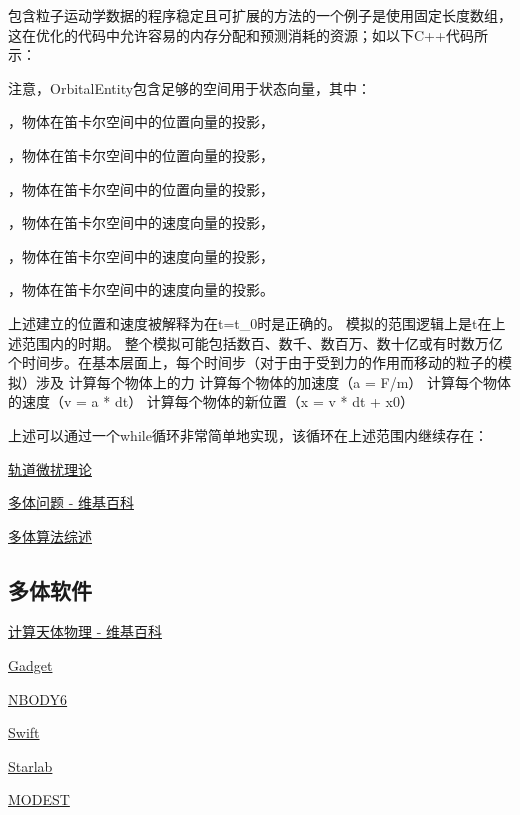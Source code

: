 包含粒子运动学数据的程序稳定且可扩展的方法的一个例子是使用固定长度数组，这在优化的代码中允许容易的内存分配和预测消耗的资源；如以下C++代码所示：

注意，OrbitalEntity包含足够的空间用于状态向量，其中：

，物体在笛卡尔空间中的位置向量的投影，

，物体在笛卡尔空间中的位置向量的投影，

，物体在笛卡尔空间中的位置向量的投影，

，物体在笛卡尔空间中的速度向量的投影，

，物体在笛卡尔空间中的速度向量的投影，

，物体在笛卡尔空间中的速度向量的投影。



上述建立的位置和速度被解释为在t=t_0时是正确的。
模拟的范围逻辑上是t在上述范围内的时期。
整个模拟可能包括数百、数千、数百万、数十亿或有时数万亿个时间步。在基本层面上，每个时间步（对于由于受到力的作用而移动的粒子的模拟）涉及
计算每个物体上的力
计算每个物体的加速度（a = F/m）
计算每个物体的速度（v = a * dt）
计算每个物体的新位置（x = v * dt + x0）

上述可以通过一个while循环非常简单地实现，该循环在上述范围内继续存在：






\href{https://en.wikipedia.org/wiki/Orbit_modeling}{轨道微扰理论}

\href{https://en.wikipedia.org/wiki/N-body_problem}{多体问题 - 维基百科}

\href{https://arxiv.org/abs/0806.3950v1}{多体算法综述}

\subsection{多体软件}

\href{https://en.wikipedia.org/wiki/Computational_astrophysics}{计算天体物理 - 维基百科}

\href{https://wwwmpa.mpa-garching.mpg.de/gadget/}{Gadget}

\href{https://people.ast.cam.ac.uk/~sverre/web/pages/nbody.htm}{NBODY6}

\href{https://www.boulder.swri.edu/~hal/swift.html}{Swift}

\href{https://www.sns.ias.edu/~starlab/}{Starlab}

\href{http://www.manybody.org/modest/}{MODEST}

